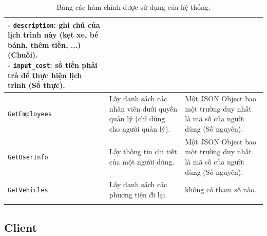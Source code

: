 \documentclass[a4paper]{article}
\begin{document}
\begin{longtable}{|m{3cm}|m{3.6cm}|m{6.8cm}|}
{- \texttt{description}: ghi chú của lịch trình này (kẹt xe, bể bánh, thêm tiền, ...) (Chuỗi).\\
- \texttt{input\_cost}: số tiền phải trả để thực hiện lịch trình (Số thực).\\}\\\hline
\texttt{GetEmployees}&Lấy danh sách các nhân viên dưới quyền quản lý (chỉ dùng cho người quản lý).&Một JSON Object bao một trường duy nhất là mã số của người dùng (Số nguyên). \\\hline
\texttt{GetUserInfo}&Lấy thông tin chi tiết của một người dùng.&Một JSON Object bao một trường duy nhất là mã số của người dùng (Số nguyên). \\\hline
\texttt{GetVehicles}&Lấy danh sách các phương tiện đi lại.&không có tham số nào. \\\hline
    \caption{Bảng các hàm chính được sử dụng của hệ thống.}
\end{longtable}
\subsection{Client}
\end{document}
